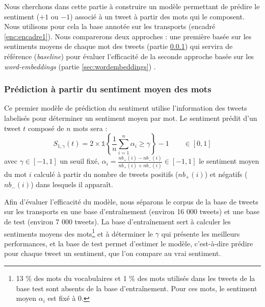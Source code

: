 \documentclass[11pt,french,french]{article}
\let\rmarkdownfootnote\footnote%
\def\footnote{\protect\rmarkdownfootnote}
\begin{document}
Nous cherchons dans cette partie à construire un modèle permettant de prédire le sentiment (\(+1\) ou \(-1\)) associé à un tweet à partir des mots qui le composent.
Nous utilisons pour cela la base annotée sur les transports (encadré \ref{enc:encadre1}).
Nous comparerons deux approches : une première basée sur les sentiments moyens de chaque mot des tweets (partie \ref{sec:sentiments}) qui servira de référence (\emph{baseline}) pour évaluer l'efficacité de la seconde approche basée sur les \emph{word-embeddings} (partie \ref{sec:wordembeddings}) .

\hypertarget{sec:sentiments}{%
\subsubsection{Prédiction à partir du sentiment moyen des mots}\label{sec:sentiments}}

Ce premier modèle de prédiction du sentiment utilise l'information des tweets labelisés pour déterminer un sentiment moyen par mot.
Le sentiment prédit d'un tweet \(t\) composé de \(n\) mots sera :
\[S_{1,\gamma}(t) = 2 \times \mathds{1}\left\{ \frac{1}{n} \sum \limits_{i=1}^n \alpha_i \geq \gamma\right\} - 1 \qquad \in [0,1]\]
avec \(\gamma \in [-1,1]\) un seuil fixé, \(\alpha_i = \frac{nb_+(i) - nb_-(i)}{nb_+(i) + nb_-(i)} \in [-1,1]\) le sentiment moyen du mot \(i\) calculé à partir du nombre de tweets positifs (\(nb_+(i)\)) et négatifs (\(nb_-(i)\)) dans lesquels il apparaît.

Afin d'évaluer l'efficacité du modèle, nous séparons le corpus de la base de tweets sur les transports en une base d'entraînement (environ 16 000 tweets) et une base de test (environ 7 000 tweets). La base d'entraînement sert à calculer les sentiments moyens des mots\footnote{13 \% des mots du vocabulaires et 1 \% des mots utilisés dans les tweets de la base test sont absents de la base d'entraînement. Pour ces mots, le sentiment moyen \(\alpha_i\) est fixé à 0.} et à déterminer le \(\gamma\) qui présente les meilleurs performances, et la base de test permet d'estimer le modèle, c'est-à-dire prédire pour chaque tweet un sentiment, que l'on compare au vrai sentiment.
\end{document}
